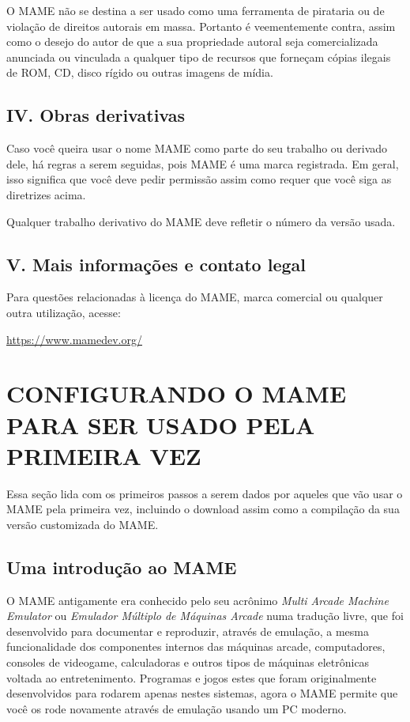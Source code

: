 \documentclass[letterpaper,10pt,brazil]{sphinxmanual}
\begin{document}
O MAME não se destina a ser usado como uma ferramenta de pirataria ou de
violação de direitos autorais em massa. Portanto é veementemente contra,
assim como o desejo do autor de que a sua propriedade autoral seja
comercializada anunciada ou vinculada a qualquer tipo de recursos que
forneçam cópias ilegais de ROM, CD, disco rígido ou outras imagens de
mídia.


\section{IV. Obras derivativas}
\label{whatis:iv-obras-derivativas}
Caso você queira usar o nome MAME como parte do seu trabalho ou derivado
dele, há regras a serem seguidas, pois MAME é uma marca registrada.
Em geral, isso significa que você deve pedir permissão assim como requer
que você siga as diretrizes acima.

Qualquer trabalho derivativo do MAME deve refletir o número da versão
usada.


\section{V. Mais informações e contato legal}
\label{whatis:v-mais-informacoes-e-contato-legal}
Para questões relacionadas à licença do MAME, marca comercial ou
qualquer outra utilização, acesse:

\url{https://www.mamedev.org/}


\chapter{CONFIGURANDO O MAME PARA SER USADO PELA PRIMEIRA VEZ}
\label{initialsetup/index:configurando-o-mame-para-ser-usado-pela-primeira-vez}\label{initialsetup/index::doc}
Essa seção lida com os primeiros passos a serem dados por aqueles que
vão usar o MAME pela primeira vez, incluindo o download assim como
a compilação da sua versão customizada do MAME.


\section{Uma introdução ao MAME}
\label{initialsetup/mameintro:uma-introducao-ao-mame}\label{initialsetup/mameintro::doc}
O MAME antigamente era conhecido pelo seu acrônimo \emph{Multi Arcade Machine
Emulator} ou \emph{Emulador Múltiplo de Máquinas Arcade} numa tradução livre,
que foi desenvolvido para documentar e reproduzir, através de emulação,
a mesma funcionalidade dos componentes internos das máquinas arcade,
computadores, consoles de videogame, calculadoras e outros tipos de
máquinas eletrônicas voltada ao entretenimento. Programas e jogos estes
que foram originalmente desenvolvidos para rodarem apenas nestes
sistemas, agora o MAME permite que você os rode novamente através de
emulação usando um PC moderno.
\end{document}
